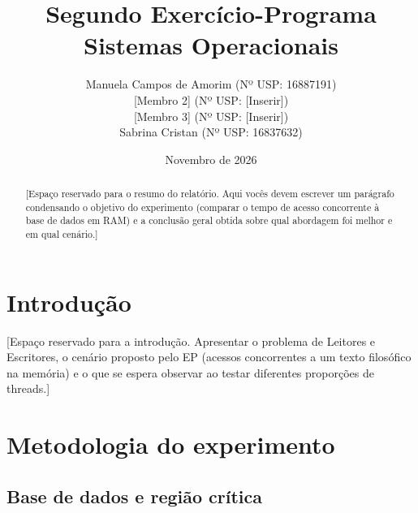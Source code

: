 \documentclass[11pt, a4paper]{article}
\title{Segundo Exercício-Programa\\ \large Sistemas Operacionais}
\author{
    Manuela Campos de Amorim (Nº USP: 16887191) \\
    {[Membro 2]} (Nº USP: [Inserir]) \\
    {[Membro 3]} (Nº USP: [Inserir]) \\
    Sabrina Cristan (Nº USP: 16837632)
}
\date{Novembro de 2026}
\begin{document}
\maketitle

\begin{abstract}
    [Espaço reservado para o resumo do relatório. Aqui vocês devem escrever um parágrafo condensando o objetivo do experimento (comparar o tempo de acesso concorrente à base de dados em RAM) e a conclusão geral obtida sobre qual abordagem foi melhor e em qual cenário.]
\end{abstract}

\section{Introdução}
[Espaço reservado para a introdução. Apresentar o problema de Leitores e Escritores, o cenário proposto pelo EP (acessos concorrentes a um texto filosófico na memória) e o que se espera observar ao testar diferentes proporções de threads.]

\section{Metodologia do experimento}
\subsection{Base de dados e região crítica}
\end{document}

